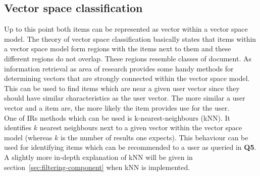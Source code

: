\subsection{Vector space classification}
Up to this point both items can be represented as vector within a vector space model.
The theory of vector space classification basically states that items within a vector space model form regions with the items next to them and these different regions do not overlap.
These regions resemble classes of document.
\citep[p.~298-291]{manning:2009}
As information retrieval as area of research provides some handy methods for determining vectors that are strongly connected within the vector space model.
This can be used to find items which are near a given user vector since they should have similar characteristics as the user vector.
The more similar a user vector and a item are, the more likely the item provides use for the user.
\citep[p.~298-291]{manning:2009}
\\
One of IRs methods which can be used is k-nearest-neighbours (kNN).
It identifies $k$ nearest neighbours next to a given vector within the vector space model (whereas $k$ is the number of results one expects).
This behaviour can be used for identifying items which can be recommended to a user as queried in \textbf{Q5}.
A slightly more in-depth explanation of kNN will be given in section~\ref{sec:filtering-component} when kNN is implemented.
%
